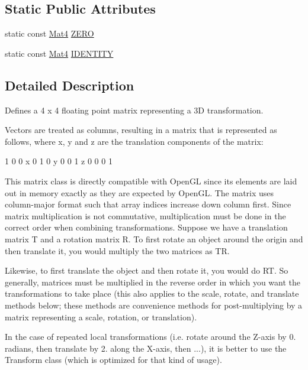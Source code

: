 \subsection*{Static Public Attributes}
\begin{DoxyCompactItemize}
\item 
static const \hyperlink{classMat4}{Mat4} \hyperlink{classMat4_ad362a417d8a274550042473c43bdfb92}{Z\+E\+RO}
\item 
static const \hyperlink{classMat4}{Mat4} \hyperlink{classMat4_ac4322622c4d5884e00c56d902b2e755b}{I\+D\+E\+N\+T\+I\+TY}
\end{DoxyCompactItemize}


\subsection{Detailed Description}
Defines a 4 x 4 floating point matrix representing a 3D transformation.

Vectors are treated as columns, resulting in a matrix that is represented as follows, where x, y and z are the translation components of the matrix\+: \begin{DoxyVerb}1  0  0  x
0  1  0  y
0  0  1  z
0  0  0  1
\end{DoxyVerb}


This matrix class is directly compatible with Open\+GL since its elements are laid out in memory exactly as they are expected by Open\+GL. The matrix uses column-\/major format such that array indices increase down column first. Since matrix multiplication is not commutative, multiplication must be done in the correct order when combining transformations. Suppose we have a translation matrix T and a rotation matrix R. To first rotate an object around the origin and then translate it, you would multiply the two matrices as TR.

Likewise, to first translate the object and then rotate it, you would do RT. So generally, matrices must be multiplied in the reverse order in which you want the transformations to take place (this also applies to the scale, rotate, and translate methods below; these methods are convenience methods for post-\/multiplying by a matrix representing a scale, rotation, or translation).

In the case of repeated local transformations (i.\+e. rotate around the Z-\/axis by 0. radians, then translate by 2. along the X-\/axis, then ...), it is better to use the Transform class (which is optimized for that kind of usage).

